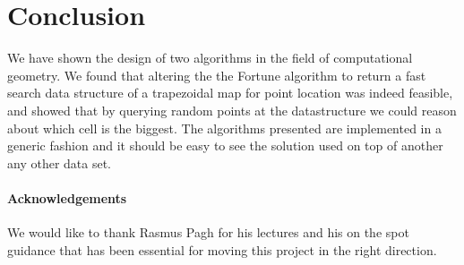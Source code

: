 \section{Conclusion}
We have shown the design of two algorithms in the field of computational geometry. We found that altering the the Fortune algorithm to return a fast search data structure of a trapezoidal map for point location was indeed feasible, and showed that by querying random points at the datastructure we could reason about which cell is the biggest. The algorithms presented are implemented in a generic fashion and it should be easy to see the solution used on top of another any other data set.
\paragraph{Acknowledgements}
We would like to thank Rasmus Pagh for his lectures and his on the spot guidance that has been essential for moving this project in the right direction.  